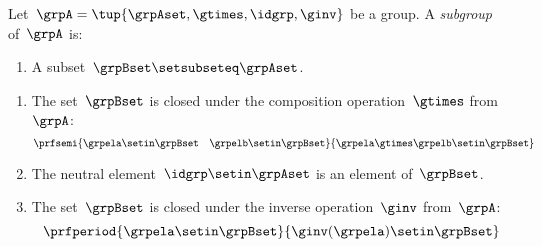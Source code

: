 \begin{definition}
    Let~$\grpA = \tup{\grpAset, \gtimes, \idgrp, \ginv}$ be a group.
    A \emph{subgroup} of~$\grpA$ is:

    \constit

    \begin{enumerate}
        \item A subset~$\grpBset \setsubseteq \grpAset$.
    \end{enumerate}

    \condit

    \begin{enumerate}
        \item The set~$\grpBset$ is closed under the composition operation~$\gtimes$ from~$\grpA$:
              \begin{equation}
                  \prfsemi{\grpela \setin \grpBset \quad \grpelb \setin \grpBset}{\grpela \gtimes \grpelb \setin \grpBset}
              \end{equation}

        \item The neutral element~$\idgrp \setin \grpAset$ is an element of~$\grpBset$.

        \item The set~$\grpBset$ is closed under the inverse operation~$\ginv$ from~$\grpA$:
              \begin{equation}
                  \prfperiod{\grpela \setin \grpBset}{\ginv(\grpela) \setin \grpBset}
              \end{equation}
    \end{enumerate}
\end{definition}
